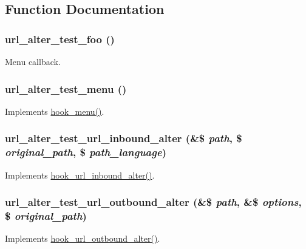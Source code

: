 \subsection{Function Documentation}
\hypertarget{url__alter__test_8module_aef905b190ed8a2208c811f8477986c6e}{
\subsubsection[{url\_\-alter\_\-test\_\-foo}]{\setlength{\rightskip}{0pt plus 5cm}url\_\-alter\_\-test\_\-foo ()}}
\label{url__alter__test_8module_aef905b190ed8a2208c811f8477986c6e}
Menu callback. \hypertarget{url__alter__test_8module_a5f65360466b54f792d0d1c7567a852be}{
\subsubsection[{url\_\-alter\_\-test\_\-menu}]{\setlength{\rightskip}{0pt plus 5cm}url\_\-alter\_\-test\_\-menu ()}}
\label{url__alter__test_8module_a5f65360466b54f792d0d1c7567a852be}
Implements \hyperlink{group__hooks_ga5c95244fea59b25666e409759e133ded}{hook\_\-menu()}. \hypertarget{url__alter__test_8module_a4f7e4dc47e41c096798686ede0bf2017}{
\subsubsection[{url\_\-alter\_\-test\_\-url\_\-inbound\_\-alter}]{\setlength{\rightskip}{0pt plus 5cm}url\_\-alter\_\-test\_\-url\_\-inbound\_\-alter (\&\$ {\em path}, \/  \$ {\em original\_\-path}, \/  \$ {\em path\_\-language})}}
\label{url__alter__test_8module_a4f7e4dc47e41c096798686ede0bf2017}
Implements \hyperlink{group__hooks_ga32da9c3f1486c293818f30fa4037e33f}{hook\_\-url\_\-inbound\_\-alter()}. \hypertarget{url__alter__test_8module_a3ea0dfd88b5356e660c94bb4b832a487}{
\subsubsection[{url\_\-alter\_\-test\_\-url\_\-outbound\_\-alter}]{\setlength{\rightskip}{0pt plus 5cm}url\_\-alter\_\-test\_\-url\_\-outbound\_\-alter (\&\$ {\em path}, \/  \&\$ {\em options}, \/  \$ {\em original\_\-path})}}
\label{url__alter__test_8module_a3ea0dfd88b5356e660c94bb4b832a487}
Implements \hyperlink{group__hooks_gaae456dc4459a029bc099079814ded61f}{hook\_\-url\_\-outbound\_\-alter()}. 